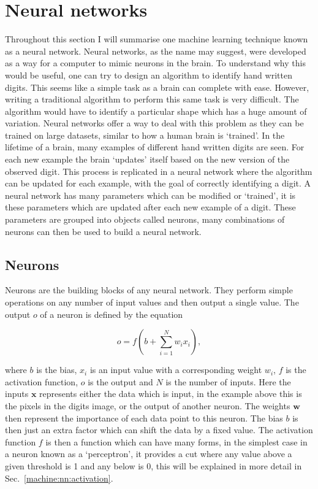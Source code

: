 \section{\label{machine:nn}Neural networks}


Throughout this section I will summarise one machine learning technique known as a neural network. 
Neural networks, as the name may suggest, were developed as a way for a computer to mimic neurons in the brain.
To understand why this would be useful, one can try to design an algorithm to identify hand written digits.
This seems like a simple task as a brain can complete with ease. 
However, writing a traditional algorithm to perform this same task is very difficult. 
The algorithm would have to identify a particular shape which has a huge amount of variation.
Neural networks offer a way to deal with this problem as they can be trained on large datasets, similar to how a human brain is `trained'. 
In the lifetime of a brain, many examples of different hand written digits are seen. 
For each new example the brain `updates' itself based on the new version of the observed digit. 
This process is replicated in a neural network where the algorithm can be updated for each example, with the goal of correctly identifying a digit.
A neural network has many parameters which can be modified or `trained', it is these parameters which are updated after each new example of a digit. 
These parameters are grouped into objects called neurons, many combinations of neurons can then be used to build a neural network.

\subsection{\label{machine:nn:neuron}Neurons}

Neurons are the building blocks of any neural network.
They perform simple operations on any number of input values and then output a single value.
The output $o$ of a neuron is defined by the equation

\begin{equation}
    o = f\left(b + \sum_{i=1}^{N} w_i x_i  \right),
    \label{machine:nn:neuron:equation}
\end{equation}

where $b$ is the bias, $x_i$ is an input value with a corresponding weight $w_i$, $f$ is the activation function, $o$ is the output and $N$ is the number of inputs.
Here the inputs $\mathbf{x}$ represents either the data which is input, in the example above this is the pixels in the digits image, or the output of another neuron.
The weights $\mathbf{w}$ then represent the importance of each data point to this neuron. 
The bias $b$ is then just an extra factor which can shift the data by a fixed value.
The activation function $f$ is then a function which can have many forms, in the simplest case in a neuron known as a `perceptron', it provides a cut where any value above a given threshold is 1 and any below is 0, this will be explained in more detail in Sec.~\ref{machine:nn:activation}. 

